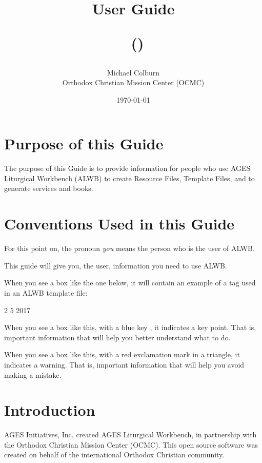 \documentclass[]{memoir}
\title{User Guide\\\bigskip

\iocDocName\   (\iocDoc) \\\bigskip
}
\author{Michael Colburn\\Orthodox Christian Mission Center (OCMC)}
\date{\today}
\begin{document}
\maketitle
\tableofcontents

\vfill

\pagebreak

\chapter{Purpose of this Guide}

The purpose of this Guide is to provide information for people who use AGES Liturgical Workbench (ALWB) to create Resource Files, Template Files, and to generate services and books.

\chapter{Conventions Used in this Guide}

For this point on, the pronoun \emph{you} means the person who is the user of ALWB.

This guide will give you, the user, information you need to use ALWB.

When you see a box like the one below, it will contain an example of a tag used in an ALWB template file:

\begin{atem}
 2
 5
 2017
\end{atem}

\begin{boxed}
When you see a box like this, with a blue key \color{blue}\faKey{}\color{black}, it indicates a key point.  That is, important information that will help you better understand what to do.
\end{boxed}
\begin{warning}
When you see a box like this, with a red exclamation mark in a triangle, it indicates a warning.  That is, important information that will help you avoid making a mistake.
\end{warning}

\chapter{Introduction}

AGES Initiatives, Inc. created AGES Liturgical Workbench, in partnership with the Orthodox Christian Mission Center (OCMC).  This open source software was created on behalf of the international Orthodox Christian community.  
\end{document}
